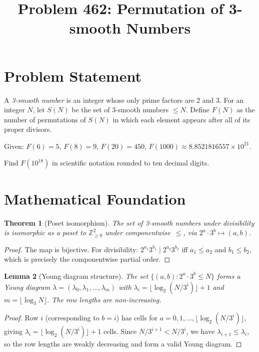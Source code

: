 \documentclass[11pt]{article}
\title{Problem 462: Permutation of 3-smooth Numbers}
\author{}
\date{}
\newtheorem{theorem}{Theorem}
\newtheorem{lemma}[theorem]{Lemma}
\begin{document}
\maketitle

\section{Problem Statement}

A \emph{3-smooth number} is an integer whose only prime factors are 2 and 3. For an integer $N$, let $S(N)$ be the set of 3-smooth numbers $\le N$. Define $F(N)$ as the number of permutations of $S(N)$ in which each element appears after all of its proper divisors.

Given: $F(6) = 5$, $F(8) = 9$, $F(20) = 450$, $F(1000) \approx 8.8521816557 \times 10^{21}$.

Find $F(10^{18})$ in scientific notation rounded to ten decimal digits.

\section{Mathematical Foundation}

\begin{theorem}[Poset isomorphism]
\label{thm:poset}
The set of 3-smooth numbers under divisibility is isomorphic as a poset to $\mathbb{Z}_{\ge 0}^2$ under componentwise~$\le$, via $2^a \cdot 3^b \mapsto (a, b)$.
\end{theorem}

\begin{proof}
The map is bijective. For divisibility: $2^{a_1} 3^{b_1} \mid 2^{a_2} 3^{b_2}$ iff $a_1 \le a_2$ and $b_1 \le b_2$, which is precisely the componentwise partial order.
\end{proof}

\begin{lemma}[Young diagram structure]
\label{lem:young}
The set $\{(a, b) : 2^a \cdot 3^b \le N\}$ forms a Young diagram $\lambda = (\lambda_0, \lambda_1, \ldots, \lambda_m)$ with $\lambda_i = \lfloor \log_2(N/3^i) \rfloor + 1$ and $m = \lfloor \log_3 N \rfloor$. The row lengths are non-increasing.
\end{lemma}

\begin{proof}
Row $i$ (corresponding to $b = i$) has cells for $a = 0, 1, \ldots, \lfloor \log_2(N/3^i) \rfloor$, giving $\lambda_i = \lfloor \log_2(N/3^i) \rfloor + 1$ cells. Since $N/3^{i+1} < N/3^i$, we have $\lambda_{i+1} \le \lambda_i$, so the row lengths are weakly decreasing and form a valid Young diagram.
\end{proof}
\end{document}
